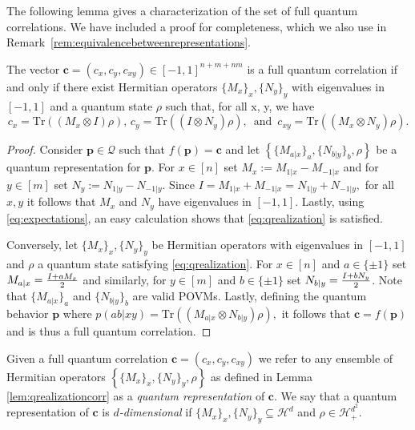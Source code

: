 \documentclass{siamart}
\begin{document}
{{The following  lemma gives a characterization  of the set of full quantum correlations.  We have included a  proof for completeness, which we also use in  Remark~\ref{rem:equivalencebetweenrepresentations}.}

\medskip 
\begin{lemma}\label{lem:qrealizationcorr}
The vector  $\mathbf{c}=\left( c_x, c_y, c_{xy}\right)\in [-1,1]^{n+m+nm}$ is a full quantum correlation
if and only if  there exist Hermitian  operators
 $\{M_x\}_{x}, \{N_y\}_{y}$ with eigenvalues in $[-1,1]$ and a quantum state $\rho$ such that, {for all x, y, we have}
\begin{equation}
\label{eq:qrealization}
c_x={\mathrm{Tr}}((M_x\otimes I)\rho), \, c_y={\mathrm{Tr}}((I\otimes N_y)\rho), \,  \text{ and } \, c_{xy}={\mathrm{Tr}}((M_x\otimes N_y)\rho).
\end{equation}
\end{lemma}
\medskip 

\begin{proof}
Consider ${\mathbf{p}}\in {\mathcal{Q}}$ such that $f({\mathbf{p}})={\mathbf{c}}$ and let $\left\{ \{
M_{a|x}\}_a, \{ N_{b|y}\}_b, \rho\right\}$ be a quantum representation  for ${\mathbf{p}}$.
For $x\in [n]$  set $M_x:=M_{1|x}-M_{-1|x}$ and for $y\in[m]$ set $N_y:=N_{1|y}-N_{-1|y}$. Since $I=M_{1|x}+M_{-1|x}=N_{1|y}+N_{-1|y},$ for all $x,y$ it follows that $M_x$ and $N_y$ have eigenvalues in $[-1,1]$. Lastly, using  \eqref{eq:expectations}, an easy calculation shows that \eqref{eq:qrealization} is satisfied.

Conversely,  let $\{M_x\}_{x}, \{N_y\}_{y}$ be Hermitian operators with eigenvalues in $[-1,1]$
 and $\rho$  a quantum state satisfying \eqref{eq:qrealization}. For $x\in [n]$ and $a\in \{\pm 1\}$ set $M_{a|x}={I+aM_x\over 2}$ and similarly,  for $y\in [m]$ and $b\in \{\pm 1\}$ set $N_{b|y}={I+bN_y\over 2}$. Note that $\{M_{a|x}\}_{a}$ and $\{N_{b|y}\}_b$ are valid POVMs.
 Lastly, defining  the quantum behavior ${\mathbf{p}} $ where  $p(ab|xy)={\mathrm{Tr}}((M_{a|x}\otimes N_{b|y})\rho),$ it follows {that  $\mathbf{c}=f({\mathbf{p}})$ and is thus a full quantum correlation}.
\end{proof}
\medskip

Given a full quantum correlation $  {\mathbf{c}}=\left( c_x, c_y, c_{xy}\right)$ we  refer to any   ensemble of Hermitian operators  $\left\{ \{M_x\}_{x}, \{N_y\}_{y}, \rho\right\}$  as defined in Lemma \ref{lem:qrealizationcorr} as a {\em quantum representation} of ${\mathbf{c}}$. We say that a  quantum  representation  of ${\mathbf{c}}$ is {\em $d$-dimensional} if $\{M_x\}_x,\{N_y\}_y {\subseteq {\mathcal{H}}^d}$ and {$\rho \in {\mathcal{H}}_+^{d^2}$}.

}
\end{document}
